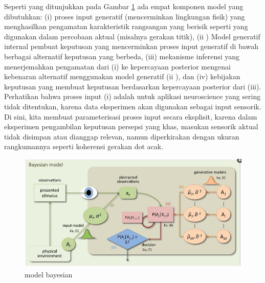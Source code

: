 Seperti yang ditunjukkan pada Gambar \ref {bayesian} ada empat komponen model yang dibutuhkan: (i) proses input generatif (mencerminkan lingkungan fisik) yang menghasilkan pengamatan karakteristik rangsangan yang berisik seperti yang digunakan dalam percobaan aktual (misalnya gerakan titik), (ii ) Model generatif internal pembuat keputusan yang mencerminkan proses input generatif di bawah berbagai alternatif keputusan yang berbeda, (iii) mekanisme inferensi yang menerjemahkan pengamatan dari (i) ke kepercayaan posterior mengenai kebenaran alternatif menggunakan model generatif (ii ), dan (iv) kebijakan keputusan yang membuat keputusan berdasarkan kepercayaan posterior dari (iii). Perhatikan bahwa proses input (i) adalah untuk aplikasi neuroscience yang sering tidak ditentukan, karena data eksperimen akan digunakan sebagai input sensorik. Di sini, kita membuat parameterisasi proses input secara eksplisit, karena dalam eksperimen pengambilan keputusan persepsi yang khas, masukan sensorik aktual tidak disimpan atau dianggap relevan, namun diperkirakan dengan ukuran rangkumannya seperti koherensi gerakan dot acak.

	\begin{figure}[ht]
	\centerline{\includegraphics[width=1\textwidth]{figures/bayesian.png}}
	\caption{model bayesian}
	\label{bayesian}
	\end{figure}



